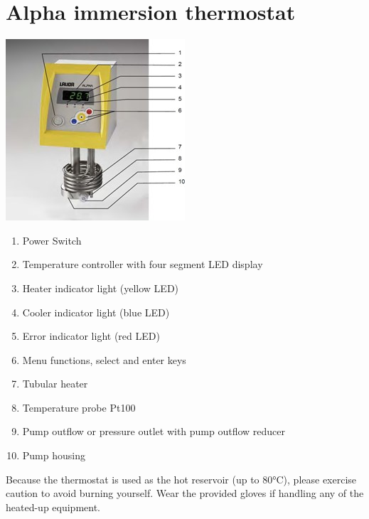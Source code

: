 \documentclass[
  letterpaper,
  DIV=11,
  numbers=noendperiod]{scrreprt}
\begin{document}
\hypertarget{alpha-immersion-thermostat}{%
\section{Alpha immersion thermostat}\label{alpha-immersion-thermostat}}

\includegraphics{./images/Thermostat.jpg}

\begin{enumerate}
\def\labelenumi{\arabic{enumi}.}
\item
  Power Switch
\item
  Temperature controller with four segment LED display
\item
  Heater indicator light (yellow LED)
\item
  Cooler indicator light (blue LED)
\item
  Error indicator light (red LED)
\item
  Menu functions, select and enter keys
\item
  Tubular heater
\item
  Temperature probe Pt100
\item
  Pump outflow or pressure outlet with pump outflow reducer
\item
  Pump housing
\end{enumerate}

\begin{tcolorbox}[enhanced jigsaw, toprule=.15mm, coltitle=black, bottomrule=.15mm, colbacktitle=quarto-callout-important-color!10!white, opacitybacktitle=0.6, titlerule=0mm, colframe=quarto-callout-important-color-frame, title=\textcolor{quarto-callout-important-color}{\faExclamation}\hspace{0.5em}{Warning}, leftrule=.75mm, bottomtitle=1mm, breakable, opacityback=0, arc=.35mm, left=2mm, colback=white, rightrule=.15mm, toptitle=1mm]

Because the thermostat is used as the hot reservoir (up to 80°C), please
exercise caution to avoid burning yourself. Wear the provided gloves if
handling any of the heated-up equipment.

\end{tcolorbox}
\end{document}
